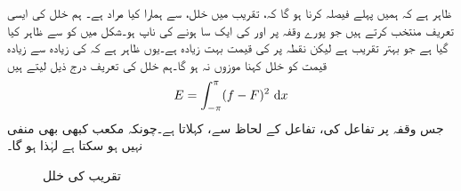 ظاہر ہے کہ ہمیں پہلے  فیصلہ کرنا ہو گا کہ، تقریب میں  خلل، سے ہمارا کیا مراد ہے۔ ہم خلل کی ایسی تعریف منتخب کرتے ہیں جو پورے وقفہ  پر  اور  کی ایک سا ہونے کی ناپ ہو۔شکل  میں  کو  سے ظاہر کیا گیا ہے جو بہتر تقریب ہے لیکن نقطہ  پر  کی قیمت بہت زیادہ ہے۔یوں ظاہر ہے کہ  کی زیادہ سے زیادہ قیمت کو خلل کہنا موزوں نہ ہو گا۔ہم خلل کی تعریف درج ذیل لیتے ہیں
\begin{align}\label{مساوات_فوریئر_تقریب_پ}
E=\int_{-\pi}^{\pi} (f-F)^2\,\dif x
\end{align}
جس وقفہ  پر تفاعل  کی، تفاعل  کے لحاظ سے،   کہلاتا ہے۔چونکہ مکعب کبھی بھی منفی نہیں ہو سکتا ہے لہٰذا  ہو گا۔
\begin{figure}
\centering
{}
\caption{تقریب کی خلل}
\label{شکل_فوریئر_خلل_تقریب}
\end{figure}

